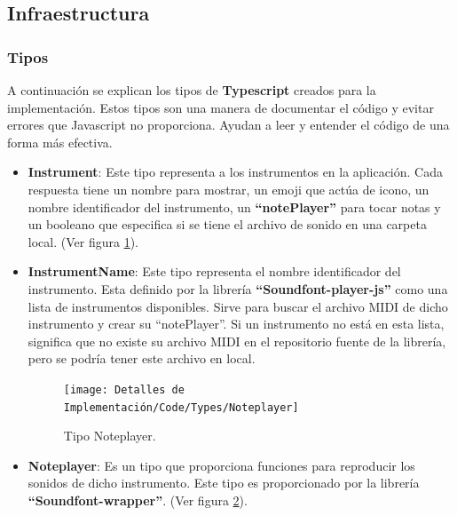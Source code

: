 \documentclass[12pt,twoside,titlepage]{report}
\begin{document}
\subsection{Infraestructura}

\subsubsection{Tipos}

A continuación se explican los tipos de \textbf{Typescript} creados para la implementación. Estos tipos son una manera de documentar el código y evitar errores que Javascript no proporciona. Ayudan a leer y entender el código de una forma más efectiva.

\begin{itemize}
    \begin{figure}[H]
        \centering
        \texttt{[image: Detalles de Implementación/Code/Types/Instrument]}
        \caption{Tipo Instrument.}
        \label{fig:Instrument}
    \end{figure}

    \item \textbf{Instrument}: Este tipo representa a los instrumentos en la aplicación. Cada respuesta tiene un nombre para mostrar, un emoji que actúa de icono, un nombre identificador del instrumento, un \textbf{``notePlayer''} para tocar notas y un booleano que especifica si se tiene el archivo de sonido en una carpeta local. (Ver figura \ref{fig:Instrument}).
    \item \textbf{InstrumentName}: Este tipo representa el nombre identificador del instrumento. Esta definido por la librería \textbf{``Soundfont-player-js''} como una lista de instrumentos disponibles. Sirve para buscar el archivo MIDI de dicho instrumento y crear su ``notePlayer''. Si un instrumento no está en esta lista, significa que no existe su archivo MIDI en el repositorio fuente de la librería, pero se podría tener este archivo en local.
    
    \begin{figure}[H]
        \centering
        \texttt{[image: Detalles de Implementación/Code/Types/Noteplayer]}
        \caption{Tipo Noteplayer.}
        \label{fig:Noteplayer}
    \end{figure}

    \item \textbf{Noteplayer}: Es un tipo que proporciona funciones para reproducir los sonidos de dicho instrumento. Este tipo es proporcionado por la librería \textbf{``Soundfont-wrapper''}. (Ver figura \ref{fig:Noteplayer}).


\end{itemize}
\end{document}
